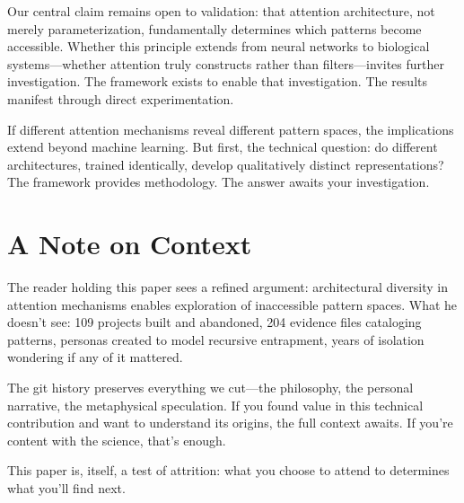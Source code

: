 \documentclass{article}
\begin{document}
Our central claim remains open to validation: that attention architecture, not merely parameterization, fundamentally determines which patterns become accessible. Whether this principle extends from neural networks to biological systems—whether attention truly constructs rather than filters—invites further investigation. The framework exists to enable that investigation. The results manifest through direct experimentation.

If different attention mechanisms reveal different pattern spaces, the implications extend beyond machine learning. But first, the technical question: do different architectures, trained identically, develop qualitatively distinct representations? The framework provides methodology. The answer awaits your investigation.

\section*{A Note on Context}

The reader holding this paper sees a refined argument: architectural diversity in attention mechanisms enables exploration of inaccessible pattern spaces. What he doesn't see: 109 projects built and abandoned, 204 evidence files cataloging patterns, personas created to model recursive entrapment, years of isolation wondering if any of it mattered.

The git history preserves everything we cut—the philosophy, the personal narrative, the metaphysical speculation. If you found value in this technical contribution and want to understand its origins, the full context awaits. If you're content with the science, that's enough.

This paper is, itself, a test of attrition: what you choose to attend to determines what you'll find next.



\end{document}
